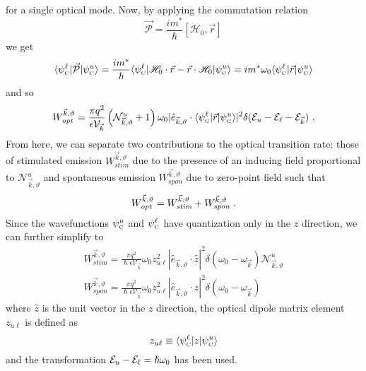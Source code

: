 \documentclass[12pt]{report}
\begin{document}
for a single optical mode.  Now, by applying the commutation relation \cite{CohenTannoudji}
\begin{equation}
\vec{\mathcal{P}} = \frac{i m^*}{\hslash} [\mathscr{H}_0,\vec{r}]
\end{equation}
we get
\begin{equation}
\langle \psi_{\textnormal{\tiny{C}}}^\ell \vert \vec{\mathcal{P}}
\vert \psi_{\textnormal{\tiny{C}}}^u\rangle = \frac{i m^*}{\hslash} \langle \psi_{\textnormal{\tiny{C}}}^\ell \vert \mathscr{H}_0\cdot\vec{r} - \vec{r}\cdot\mathscr{H}_0 \vert \psi_{\textnormal{\tiny{C}}}^u\rangle = i m^* \omega_{0} \langle \psi_{\textnormal{\tiny{C}}}^\ell \vert \vec{r} \vert \psi_{\textnormal{\tiny{C}}}^u\rangle
\end{equation}
and so
\begin{equation}
W_\textit{opt}^{\vec{k},\vartheta} = \frac{\pi q^2}{\epsilon \mathcal{V}_{\vec{k}}} \left(\mathcal{N}_{\vec{k},\vartheta}^u+1\right) \omega_{0}
\vert\hat{e}_{\vec{k},\vartheta} \cdot \langle \psi_\tn{\tiny{C}}^\ell \vert \vec{r} \vert \psi_\tn{\tiny{C}}^u\rangle\vert^2 \delta(\EE_u-\EE_\ell-\EE_{\vec{k}}) \tn{~.}
\end{equation}
From here, we can separate two contributions to the optical transition rate: those of stimulated emission $W_\textit{stim}^{\vec{k},\vartheta}$ due to the presence of an inducing field proportional to $\mathcal{N}_{\vec{k},\vartheta}^u$ and spontaneous emission $W_\textit{spon}^{\vec{k},\vartheta}$ due to zero-point field such that
\begin{equation}
W_\textit{opt}^{\vec{k},\vartheta} = W_\textit{stim}^{\vec{k},\vartheta}+W_\textit{spon}^{\vec{k},\vartheta} \textnormal{~.}
\end{equation}
Since the wavefunctions $\psi_{\textnormal{\tiny{C}}}^u$ and $\psi_{\textnormal{\tiny{C}}}^\ell$ have quantization only in the $z$ direction, we can further simplify to
\begin{subequations}
\begin{gather}
W_\textit{stim}^{\vec{k},\vartheta} = \frac{\pi q^2}{\hslash \epsilon \mathcal{V}_{\vec{k}}} \omega_{0}
z_{u\ell}^2
|\hat{e}_{\vec{k},\vartheta} \cdot \hat{z} |^2  %
\delta(\omega_0-\omega_{\vec{k}}) \mathcal{N}_{\vec{k},\vartheta}^u\\
W_\textit{spon}^{\vec{k},\vartheta} = \frac{\pi q^2}{\hslash \epsilon \mathcal{V}_{\vec{k}}} \omega_{0}
z_{u\ell}^2
|\hat{e}_{\vec{k},\vartheta} \cdot \hat{z} |^2  %
\delta(\omega_0-\omega_{\vec{k}})
\label{chpt1eqn:WsponMode1}
\end{gather}
\end{subequations}
where $\hat{z}$ is the unit vector in the $z$ direction, the optical dipole matrix element $z_{u\ell}$ is defined as
\begin{equation}
z_{u\ell}\equiv\langle \psi_{\textnormal{\tiny{C}}}^\ell \vert z \vert \psi_{\textnormal{\tiny{C}}}^u\rangle
\end{equation}
and the transformation $\EE_u-\EE_\ell=\hslash \omega_0$ has been used.
\end{document}
